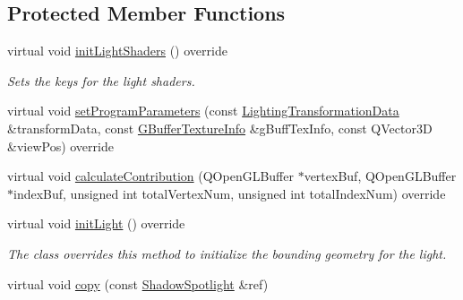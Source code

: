 \subsection*{Protected Member Functions}
\begin{DoxyCompactItemize}
\item 
\mbox{\label{class_geometry_engine_1_1_geometry_world_item_1_1_geometry_light_1_1_shadow_spotlight_aa4de61784b3cdb56739255fbcc00818c}} 
virtual void \mbox{\hyperlink{class_geometry_engine_1_1_geometry_world_item_1_1_geometry_light_1_1_shadow_spotlight_aa4de61784b3cdb56739255fbcc00818c}{init\+Light\+Shaders}} () override
\begin{DoxyCompactList}\small\item\em Sets the keys for the light shaders. \end{DoxyCompactList}\item 
virtual void \mbox{\hyperlink{class_geometry_engine_1_1_geometry_world_item_1_1_geometry_light_1_1_shadow_spotlight_aea5bd6e9315d5df327f59d752f8c6f95}{set\+Program\+Parameters}} (const \mbox{\hyperlink{class_geometry_engine_1_1_lighting_transformation_data}{Lighting\+Transformation\+Data}} \&transform\+Data, const \mbox{\hyperlink{class_geometry_engine_1_1_g_buffer_texture_info}{G\+Buffer\+Texture\+Info}} \&g\+Buff\+Tex\+Info, const Q\+Vector3D \&view\+Pos) override
\item 
virtual void \mbox{\hyperlink{class_geometry_engine_1_1_geometry_world_item_1_1_geometry_light_1_1_shadow_spotlight_a27163f2f8903220d7eaae7aa70c9d6e6}{calculate\+Contribution}} (Q\+Open\+G\+L\+Buffer $\ast$vertex\+Buf, Q\+Open\+G\+L\+Buffer $\ast$index\+Buf, unsigned int total\+Vertex\+Num, unsigned int total\+Index\+Num) override
\item 
\mbox{\label{class_geometry_engine_1_1_geometry_world_item_1_1_geometry_light_1_1_shadow_spotlight_a93e2c91b4377ecb98cf4c0409364c7be}} 
virtual void \mbox{\hyperlink{class_geometry_engine_1_1_geometry_world_item_1_1_geometry_light_1_1_shadow_spotlight_a93e2c91b4377ecb98cf4c0409364c7be}{init\+Light}} () override
\begin{DoxyCompactList}\small\item\em The class overrides this method to initialize the bounding geometry for the light. \end{DoxyCompactList}\item 
virtual void \mbox{\hyperlink{class_geometry_engine_1_1_geometry_world_item_1_1_geometry_light_1_1_shadow_spotlight_a675183375855625b787de617239aa6fb}{copy}} (const \mbox{\hyperlink{class_geometry_engine_1_1_geometry_world_item_1_1_geometry_light_1_1_shadow_spotlight}{Shadow\+Spotlight}} \&ref)
\end{DoxyCompactItemize}
